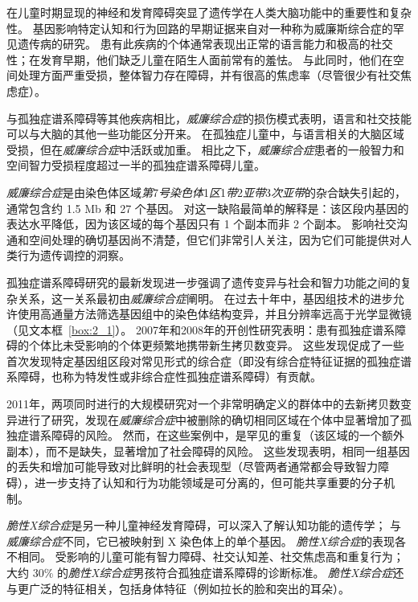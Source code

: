在儿童时期显现的神经和发育障碍突显了遗传学在人类大脑功能中的重要性和复杂性。
基因影响特定认知和行为回路的早期证据来自对一种称为威廉斯综合症的罕见遗传病的研究。
患有此疾病的个体通常表现出正常的语言能力和极高的社交性；在发育早期，他们缺乏儿童在陌生人面前常有的羞怯。
与此同时，他们在空间处理方面严重受损，整体智力存在障碍，并有很高的焦虑率（尽管很少有社交焦虑症）。


与孤独症谱系障碍等其他疾病相比，\textit{威廉综合症}的损伤模式表明，语言和社交技能可以与大脑的其他一些功能区分开来。
在孤独症儿童中，与语言相关的大脑区域受损，但在\textit{威廉综合症}中活跃或加重。
相比之下，\textit{威廉综合症}患者的一般智力和空间智力受损程度超过一半的孤独症谱系障碍儿童。


\textit{威廉综合症}是由染色体区域\textit{第}7\textit{号染色体}1\textit{区}1\textit{带}2\textit{亚带}3\textit{次亚带}的杂合缺失引起的，通常包含约 1.5 Mb 和 27 个基因。
对这一缺陷最简单的解释是：该区段内基因的表达水平降低，因为该区域的每个基因只有 1 个副本而非 2 个副本。
影响社交沟通和空间处理的确切基因尚不清楚，但它们非常引人关注，因为它们可能提供对人类行为遗传调控的洞察。



孤独症谱系障碍研究的最新发现进一步强调了遗传变异与社会和智力功能之间的复杂关系，这一关系最初由\textit{威廉综合症}阐明。
在过去十年中，基因组技术的进步允许使用高通量方法筛选基因组中的染色体结构变异，并且分辨率远高于光学显微镜（见文本框~\ref{box:2_1}）。
2007年和2008年的开创性研究表明：患有孤独症谱系障碍的个体比未受影响的个体更频繁地携带新生拷贝数变异。
这些发现促成了一些首次发现特定基因组区段对常见形式的综合症（即没有综合症特征证据的孤独症谱系障碍，也称为特发性或非综合症性孤独症谱系障碍）有贡献。


2011年，两项同时进行的大规模研究对一个非常明确定义的群体中的去新拷贝数变异进行了研究，发现在\textit{威廉综合症}中被删除的确切相同区域在个体中显著增加了孤独症谱系障碍的风险。
然而，在这些案例中，是罕见的重复（该区域的一个额外副本），而不是缺失，显著增加了社会障碍的风险。
这些发现表明，相同一组基因的丢失和增加可能导致对比鲜明的社会表现型（尽管两者通常都会导致智力障碍），进一步支持了认知和行为功能领域是可分离的，但可能共享重要的分子机制。



\textit{脆性X综合症}是另一种儿童神经发育障碍，可以深入了解认知功能的遗传学；
与\textit{威廉综合症}不同，它已被映射到 X 染色体上的单个基因。
\textit{脆性X综合症}的表现各不相同。
受影响的儿童可能有智力障碍、社交认知差、社交焦虑高和重复行为；
大约 30\% 的\textit{脆性X综合症}男孩符合孤独症谱系障碍的诊断标准。
\textit{脆性X综合症}还与更广泛的特征相关，包括身体特征（例如拉长的脸和突出的耳朵）。



